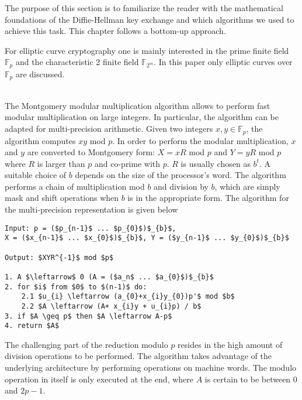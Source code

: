 The purpose of this section is to familiarize the reader with the mathematical foundations of the Diffie-Hellman key exchange and which algorithms we used to achieve this task. This chapter follows a bottom-up approach.

 For elliptic curve cryptography one is mainly interested in the prime finite field $\mathbb{F}_p$ and the characteristic 2 finite field $\mathbb{F}_{2^m}$. In this paper only elliptic curves over $\mathbb{F}_p$ are discussed.

\\The Montgomery modular multiplication algorithm allows to perform fast modular multiplication on large integers. In particular, the algorithm can be adapted for multi-precision arithmetic. Given two integers $x,y \in \mathbb{F}_p$, the algorithm computes $xy$ mod $p$. In order to perform the modular multiplication, $x$ and $y$ are converted to Montgomery form: $X = xR$ mod $p$ and $Y = yR$ mod $p$ where $R$ is larger than $p$ and co-prime with $p$. $R$ is usually chosen as $b^{t}$. A suitable choice of $b$ depends on the size of the processor's word. The algorithm performs a chain of multiplication mod $b$ and division by $b$, which are simply mask and shift operations when $b$ is in the appropriate form. The algorithm for the multi-precision representation is given below \cite[p. 602]{Menezes:1996}


\begin{lstlisting}[frame=single, mathescape=true, captionpos=b, caption=Mulitprecision Montogmery Modular Multiplication ]
Input: p = ($p_{n-1}$ ... $p_{0}$)$_{b}$,
X = ($x_{n-1}$ ... $x_{0}$)$_{b}$, Y = ($y_{n-1}$ ... $y_{0}$)$_{b}$

Output: $XYR^{-1}$ mod $p$

1. A $\leftarrow$ 0 (A = ($a_n$ ... $a_{0}$)$_{b}$
2. for $i$ from $0$ to $(n-1)$ do:
	2.1 $u_{i} \leftarrow (a_{0}+x_{i}y_{0})p'$ mod $b$
	2.2 $A \leftarrow (A+ x_{i}y + u_{i}p) / b$
3. if $A \geq p$ then $A \leftarrow A-p$
4. return $A$
\end{lstlisting}

The challenging part of the reduction modulo $p$ resides in the high amount of division operations to be performed. The algorithm takes advantage of the underlying architecture by performing operations on machine words. The modulo operation in itself is only executed at the end, where $A$ is certain to be between $0$ and $2p-1$.

